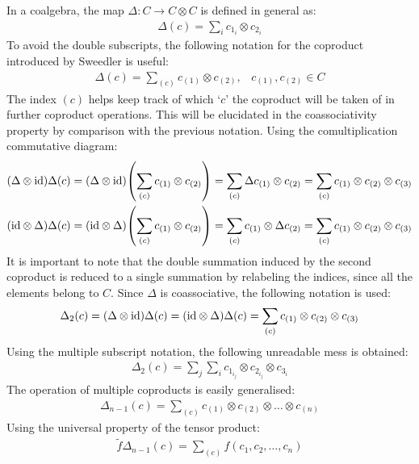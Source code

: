 \documentclass[svgnames]{article}
\theoremstyle{definition}
\theoremstyle{remark}
\theoremstyle{underline}
\theoremstyle{underline}
\newcommand{\id}{\mathrm{id}}
\begin{document}
	In a coalgebra, the map $\Delta \colon C \to C \otimes C$ is defined in general as:
	\begin{gather*}
		\Delta(c) = \sum_i c_{1_i} \otimes c_{2_i}	
	\end{gather*}
	To avoid the double subscripts, the following notation for the coproduct introduced by Sweedler is useful:
	\begin{gather*}
		\Delta(c) = \sum_{(c)} c_{(1)} \otimes c_{(2)}, \;\;\; c_{(1)}, c_{(2)} \in C
	\end{gather*}
	The index $(c)$ helps keep track of which `$c$' the coproduct will be taken of in further coproduct operations. This will be elucidated in the coassociativity property by comparison with the previous notation. Using the comultiplication commutative diagram:
	\begin{gather*}
		\pqty{\Delta \otimes \id}\Delta(c) = \pqty{\Delta \otimes \id}\pqty{\sum_{(c)} c_{(1)} \otimes c_{(2)}} = \sum_{(c)} \Delta c_{(1)} \otimes c_{(2)} = \sum_{(c)} c_{(1)} \otimes c_{(2)} \otimes c_{(3)} \\
		\pqty{\id \otimes \Delta}\Delta(c) = \pqty{\id \otimes \Delta}\pqty{\sum_{(c)} c_{(1)} \otimes c_{(2)}} = \sum_{(c)} c_{(1)} \otimes \Delta c_{(2)} = \sum_{(c)} c_{(1)} \otimes c_{(2)} \otimes c_{(3)}
	\end{gather*}
	It is important to note that the double summation induced by the second coproduct is reduced to a single summation by relabeling the indices, since all the elements belong to $C$. Since $\Delta$ is coassociative, the following notation is used:
	\begin{gather*}
		\Delta_2(c) = \pqty{\Delta \otimes \id}\Delta(c) = \pqty{\id \otimes \Delta}\Delta(c) = \sum_{(c)} c_{(1)} \otimes c_{(2)} \otimes c_{(3)}
	\end{gather*}
	Using the multiple subscript notation, the following unreadable mess is obtained:
	\begin{gather*}
		\Delta_2(c) = \sum_j \sum_i c_{1_{i_j}} \otimes c_{2_{i_j}} \otimes c_{3_i}
	\end{gather*}
	The operation of multiple coproducts is easily generalised:
	\begin{gather*}
		\Delta_{n-1}(c) = \sum_{(c)} c_{(1)} \otimes c_{(2)} \otimes \dots \otimes c_{(n)} 
	\end{gather*}
	Using the universal property of the tensor product:
	\begin{gather*}
		\tilde{f} \Delta_{n-1}(c) = \sum_{(c)} f(c_1, c_2, \dots, c_n)
	\end{gather*}
\end{document}
